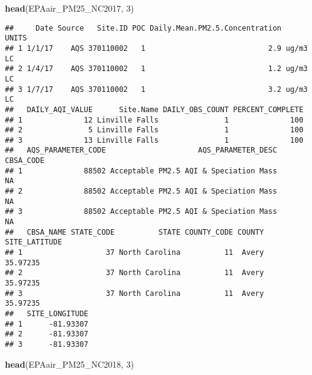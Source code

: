 \documentclass[]{article}
\newenvironment{Shaded}{\begin{snugshade}}{\end{snugshade}}
\newcommand{\KeywordTok}[1]{\textcolor[rgb]{0.13,0.29,0.53}{\textbf{#1}}}
\newcommand{\DecValTok}[1]{\textcolor[rgb]{0.00,0.00,0.81}{#1}}
\newcommand{\NormalTok}[1]{#1}
\begin{document}
\begin{Shaded}
\begin{Highlighting}[]
\KeywordTok{head}\NormalTok{(EPAair_PM25_NC2017, }\DecValTok{3}\NormalTok{)}
\end{Highlighting}
\end{Shaded}

\begin{verbatim}
##     Date Source   Site.ID POC Daily.Mean.PM2.5.Concentration    UNITS
## 1 1/1/17    AQS 370110002   1                            2.9 ug/m3 LC
## 2 1/4/17    AQS 370110002   1                            1.2 ug/m3 LC
## 3 1/7/17    AQS 370110002   1                            3.2 ug/m3 LC
##   DAILY_AQI_VALUE      Site.Name DAILY_OBS_COUNT PERCENT_COMPLETE
## 1              12 Linville Falls               1              100
## 2               5 Linville Falls               1              100
## 3              13 Linville Falls               1              100
##   AQS_PARAMETER_CODE                     AQS_PARAMETER_DESC CBSA_CODE
## 1              88502 Acceptable PM2.5 AQI & Speciation Mass        NA
## 2              88502 Acceptable PM2.5 AQI & Speciation Mass        NA
## 3              88502 Acceptable PM2.5 AQI & Speciation Mass        NA
##   CBSA_NAME STATE_CODE          STATE COUNTY_CODE COUNTY SITE_LATITUDE
## 1                   37 North Carolina          11  Avery      35.97235
## 2                   37 North Carolina          11  Avery      35.97235
## 3                   37 North Carolina          11  Avery      35.97235
##   SITE_LONGITUDE
## 1      -81.93307
## 2      -81.93307
## 3      -81.93307
\end{verbatim}

\begin{Shaded}
\begin{Highlighting}[]
\KeywordTok{head}\NormalTok{(EPAair_PM25_NC2018, }\DecValTok{3}\NormalTok{)}
\end{Highlighting}
\end{Shaded}
\end{document}
